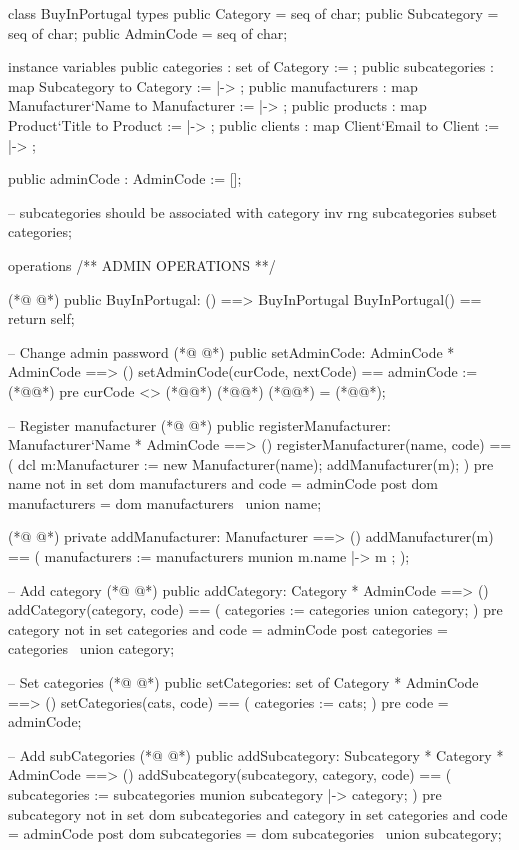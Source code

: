 \begin{vdmpp}[breaklines=true]
class BuyInPortugal
types
 public Category = seq of char;
 public Subcategory = seq of char;
 public AdminCode = seq of char;

instance variables
 public categories : set of Category := {};
 public subcategories : map Subcategory to Category := { |-> };
 public manufacturers : map Manufacturer`Name to Manufacturer := { |-> };
 public products : map Product`Title to Product := { |-> };
 public clients : map Client`Email to Client := { |-> };
 
 public adminCode : AdminCode := [];
 
 -- subcategories should be associated with category
  inv rng subcategories subset categories;

operations
 /** ADMIN OPERATIONS **/
 
(*@
\label{BuyInPortugal:22}
@*)
 public BuyInPortugal: () ==> BuyInPortugal
 BuyInPortugal() ==
  return self;
 
 -- Change admin password
(*@
\label{setAdminCode:27}
@*)
 public setAdminCode: AdminCode * AdminCode ==> ()
 setAdminCode(curCode, nextCode) ==
  adminCode := (*@@*)
 pre curCode <> (*@@*)
  (*@@*) (*@@*) = (*@@*);
 
 -- Register manufacturer
(*@
\label{registerManufacturer:34}
@*)
 public registerManufacturer: Manufacturer`Name * AdminCode ==> ()
 registerManufacturer(name, code) == (
  dcl m:Manufacturer := new Manufacturer(name);
  addManufacturer(m);
 )
 pre name not in set dom manufacturers
  and code = adminCode
 post dom manufacturers = dom manufacturers~ union {name};

(*@
\label{addManufacturer:43}
@*)
 private addManufacturer: Manufacturer ==> ()
 addManufacturer(m) == (
  manufacturers := manufacturers munion { m.name |-> m };
 );
 
 -- Add category
(*@
\label{addCategory:49}
@*)
 public addCategory: Category * AdminCode ==> ()
 addCategory(category, code) == (
  categories := categories union {category};
 )
 pre category not in set categories
  and code = adminCode
 post categories = categories~ union {category};
 
 -- Set categories
(*@
\label{setCategories:58}
@*)
 public setCategories: set of Category * AdminCode ==> ()
 setCategories(cats, code) == (
  categories := cats;
 )
 pre code = adminCode;
 
 -- Add subCategories
(*@
\label{addSubcategory:65}
@*)
 public addSubcategory: Subcategory * Category * AdminCode ==> ()
 addSubcategory(subcategory, category, code) == (
  subcategories := subcategories munion {subcategory |-> category};
 )
 pre subcategory not in set dom subcategories
  and category in set categories
  and code = adminCode
 post dom subcategories = dom subcategories~ union {subcategory};
 

\end{vdmpp}
